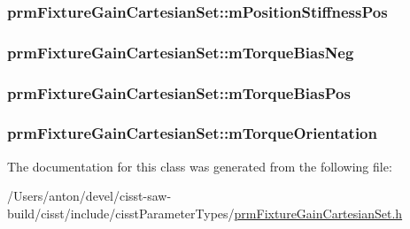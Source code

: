 \subsubsection[{m\+Position\+Stiffness\+Pos}]{ prm\+Fixture\+Gain\+Cartesian\+Set\+::m\+Position\+Stiffness\+Pos\hspace{0.3cm}{\ttfamily [protected]}}\label{classprm_fixture_gain_cartesian_set_accb48b8d58fd82b50c117ded5b27b7e0}
\hypertarget{classprm_fixture_gain_cartesian_set_a0c7b126bd6be90c4b98c6a2578ce128c}{}
\subsubsection[{m\+Torque\+Bias\+Neg}]{ prm\+Fixture\+Gain\+Cartesian\+Set\+::m\+Torque\+Bias\+Neg\hspace{0.3cm}{\ttfamily [protected]}}\label{classprm_fixture_gain_cartesian_set_a0c7b126bd6be90c4b98c6a2578ce128c}
\hypertarget{classprm_fixture_gain_cartesian_set_ade2d22274560a61e66c2f0ea936a03ea}{}
\subsubsection[{m\+Torque\+Bias\+Pos}]{ prm\+Fixture\+Gain\+Cartesian\+Set\+::m\+Torque\+Bias\+Pos\hspace{0.3cm}{\ttfamily [protected]}}\label{classprm_fixture_gain_cartesian_set_ade2d22274560a61e66c2f0ea936a03ea}
\hypertarget{classprm_fixture_gain_cartesian_set_aef19880e3a8beec82d081f21f3ca9315}{}
\subsubsection[{m\+Torque\+Orientation}]{ prm\+Fixture\+Gain\+Cartesian\+Set\+::m\+Torque\+Orientation\hspace{0.3cm}{\ttfamily [protected]}}\label{classprm_fixture_gain_cartesian_set_aef19880e3a8beec82d081f21f3ca9315}


The documentation for this class was generated from the following file\+:\begin{DoxyCompactItemize}
\item 
/\+Users/anton/devel/cisst-\/saw-\/build/cisst/include/cisst\+Parameter\+Types/\hyperlink{prm_fixture_gain_cartesian_set_8h}{prm\+Fixture\+Gain\+Cartesian\+Set.\+h}\end{DoxyCompactItemize}
